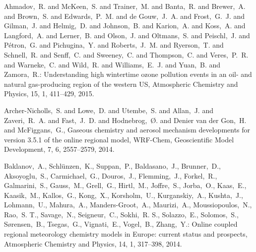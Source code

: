 \documentclass{article}
\begin{document}
\begin{thebibliography}{17}

     Ahmadov,~R. and McKeen,~S. and Trainer,~M. and Banta,~R. and Brewer,~A. and Brown,~S. and Edwards,~P.~M. and de Gouw,~J.~A. and Frost,~G.~J. and Gilman,~J. and Helmig,~D. and Johnson,~B. and Karion,~A. and Koss,~A. and Langford,~A. and Lerner,~B. and Olson,~J. and Oltmans,~S. and Peischl,~J. and P\'etron,~G. and Pichugina,~Y. and Roberts,~J.~M. and Ryerson,~T. and Schnell,~R. and Senff,~C. and Sweeney,~C. and Thompson,~C. and Veres,~P.~R. and Warneke,~C. and Wild,~R. and Williams,~E.~J. and Yuan,~B. and Zamora,~R.: Understanding high wintertime ozone pollution events in an oil- and natural gas-producing region of the western US, Atmospheric Chemistry and Physics, 15, 1, 411--429, 2015.

     Archer-Nicholls,~S. and Lowe,~D. and Utembe,~S. and Allan,~J. and Zaveri,~R.~A. and Fast,~J.~D. and Hodnebrog,~{\O}. and Denier van der Gon,~H. and McFiggans,~G., Gaseous chemistry and aerosol mechanism developments for version 3.5.1 of the online regional model, WRF-Chem, Geoscientific Model Development, 7, 6, 2557--2579, 2014.

     Baklanov,~A., Schl{\"u}nzen,~K., Suppan,~P., Baldasano,~J., Brunner,~D., Aksoyoglu,~S., Carmichael,~G., Douros,~J., Flemming,~J., Forkel,~R., Galmarini,~S., Gauss,~M., Grell,~G., Hirtl,~M., Joffre,~S., Jorba,~O., Kaas,~E., Kaasik,~M., Kallos,~G., Kong,~X., Korsholm,~U., Kurganskiy,~A., Kushta,~J., Lohmann,~U., Mahura,~A., Manders-Groot,~A., Maurizi,~A., Moussiopoulos,~N., Rao,~S. T., Savage,~N., Seigneur,~C., Sokhi,~R. S., Solazzo,~E., Solomos,~S., S{\o}rensen,~B., Tsegas,~G., Vignati,~E., Vogel,~B., Zhang,~Y.: Online coupled regional meteorology chemistry models in Europe: current status and prospects, Atmospheric Chemistry and Physics, 14, 1, 317--398, 2014.


\end{thebibliography}
\end{document}
